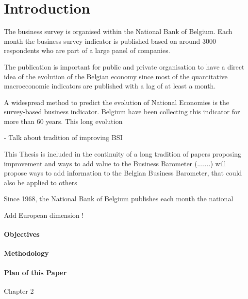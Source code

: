 \documentclass[12pt,a4paper,oneside]{book}
\begin{document}
\chapter{Introduction}

The business survey is organised within the National Bank of Belgium.
Each month the business survey indicator is published based on around 3000 respondents who are part of a large panel of companies.

The publication is important for public and private organisation to have a direct idea of the evolution of the Belgian economy since most of the quantitative macroeconomic indicators are published with a lag of at least a month.

A widespread method to predict the evolution of National Economies is the survey-based business indicator. Belgium have been collecting this indicator for more than 60 years. This long evolution 


- Talk about tradition of improving BSI

This Thesis is included in the continuity of a long tradition of papers proposing improvement and ways to add value to the Business Barometer (.......) will propose ways to add information to the Belgian Business Barometer, that could also be applied to others

Since 1968, the National Bank of Belgium publishes each month the national 

Add European dimension !


\subsubsection{Objectives}

\subsubsection{Methodology}

\subsubsection{Plan of this Paper}

Chapter 2
\end{document}
